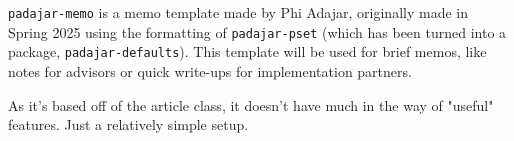 \documentclass[11pt]{padajar-memo}
\date         {\today}
\begin{document}
		\texttt{padajar-memo} is a memo template made by Phi Adajar, originally made in Spring 2025 using the formatting of \texttt{padajar-pset} (which has been turned into a package, \texttt{padajar-defaults}). This template will be used for brief memos, like notes for advisors or quick write-ups for implementation partners.

		As it's based off of the article class, it doesn't have much in the way of "useful" features. Just a relatively simple setup.

		\Blindtext[1]
		\lipsum[1-2]
		\Blindtext[1]
		\lipsum[3-4]
		\Blindtext[1]
		\lipsum[5-7]
\end{document}
